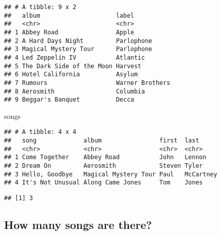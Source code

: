 \documentclass[]{article}
\newenvironment{Shaded}{\begin{snugshade}}{\end{snugshade}}
\newcommand{\KeywordTok}[1]{\textcolor[rgb]{0.13,0.29,0.53}{\textbf{#1}}}
\newcommand{\DataTypeTok}[1]{\textcolor[rgb]{0.13,0.29,0.53}{#1}}
\newcommand{\StringTok}[1]{\textcolor[rgb]{0.31,0.60,0.02}{#1}}
\newcommand{\CommentTok}[1]{\textcolor[rgb]{0.56,0.35,0.01}{\textit{#1}}}
\newcommand{\OperatorTok}[1]{\textcolor[rgb]{0.81,0.36,0.00}{\textbf{#1}}}
\newcommand{\NormalTok}[1]{#1}
\begin{document}
\begin{verbatim}
## # A tibble: 9 x 2
##   album                     label          
##   <chr>                     <chr>          
## 1 Abbey Road                Apple          
## 2 A Hard Days Night         Parlophone     
## 3 Magical Mystery Tour      Parlophone     
## 4 Led Zeppelin IV           Atlantic       
## 5 The Dark Side of the Moon Harvest        
## 6 Hotel California          Asylum         
## 7 Rumours                   Warner Brothers
## 8 Aerosmith                 Columbia       
## 9 Beggar's Banquet          Decca
\end{verbatim}

\begin{Shaded}
\begin{Highlighting}[]
\NormalTok{songs}
\end{Highlighting}
\end{Shaded}

\begin{verbatim}
## # A tibble: 4 x 4
##   song             album                first  last     
##   <chr>            <chr>                <chr>  <chr>    
## 1 Come Together    Abbey Road           John   Lennon   
## 2 Dream On         Aerosmith            Steven Tyler    
## 3 Hello, Goodbye   Magical Mystery Tour Paul   McCartney
## 4 It's Not Unusual Along Came Jones     Tom    Jones
\end{verbatim}

\begin{Shaded}
\end{Shaded}

\begin{verbatim}
## [1] 3
\end{verbatim}

\subsection{How many songs are there?}\label{how-many-songs-are-there}
\end{document}
